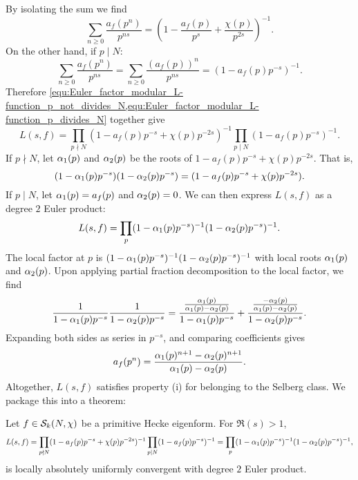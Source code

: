      By isolating the sum we find
      \begin{equation}\label{equ:Euler_factor_modular_L-function_p_not_divides_N}
        \sum_{n \ge 0}\frac{a_{f}(p^{n})}{p^{ns}} = \left(1-\frac{a_{f}(p)}{p^{s}}+\frac{\chi(p)}{p^{2s}}\right)^{-1}.
      \end{equation}
      On the other hand, if $p \mid N$:
      \begin{equation}\label{equ:Euler_factor_modular_L-function_p_divides_N}
        \sum_{n \ge 0}\frac{a_{f}(p^{n})}{p^{ns}} = \sum_{n \ge 0}\frac{(a_{f}(p))^{n}}{p^{ns}} = \left(1-a_{f}(p)p^{-s}\right)^{-1}.
      \end{equation}
      Therefore \cref{equ:Euler_factor_modular_L-function_p_not_divides_N,equ:Euler_factor_modular_L-function_p_divides_N} together give
      \[
        L(s,f) = \prod_{p \nmid N}(1-a_{f}(p)p^{-s}+\chi(p)p^{-2s})^{-1}\prod_{p \mid N}(1-a_{f}(p)p^{-s})^{-1}.
      \]
      If $p \nmid N$, let $\alpha_{1}(p)$ and $\alpha_{2}(p)$ be the roots of $1-a_{f}(p)p^{-s}+\chi(p)p^{-2s}$. That is,
      \begin{equation}\label{equ:local_parameter_definition_modfular_forms}
        (1-\alpha_{1}(p)p^{-s})(1-\alpha_{2}(p)p^{-s}) = (1-a_{f}(p)p^{-s}+\chi(p)p^{-2s}).
      \end{equation}
      If $p \mid N$, let $\alpha_{1}(p) = a_{f}(p)$ and $\alpha_{2}(p) = 0$. We can then express $L(s,f)$ as a degree $2$ Euler product:
      \[
        L(s,f) = \prod_{p}(1-\alpha_{1}(p)p^{-s})^{-1}(1-\alpha_{2}(p)p^{-s})^{-1}.
      \]
      The local factor at $p$ is $(1-\alpha_{1}(p)p^{-s})^{-1}(1-\alpha_{2}(p)p^{-s})^{-1}$ with local roots $\alpha_{1}(p)$ and $\alpha_{2}(p)$. Upon applying partial fraction decomposition to the local factor, we find
      \[
        \frac{1}{1-\alpha_{1}(p)p^{-s}}\frac{1}{1-\alpha_{2}(p)p^{-s}} = \frac{\frac{\alpha_{1}(p)}{\alpha_{1}(p)-\alpha_{2}(p)}}{1-\alpha_{1}(p)p^{-s}}+\frac{\frac{-\alpha_{2}(p)}{\alpha_{1}(p)-\alpha_{2}(p)}}{1-\alpha_{2}(p)p^{-s}}.
      \]
      Expanding both sides as series in $p^{-s}$, and comparing coefficients gives
      \begin{equation}\label{equ:Satake_coefficient_formula}
        a_{f}(p^{n}) = \frac{\alpha_{1}(p)^{n+1}-\alpha_{2}(p)^{n+1}}{\alpha_{1}(p)-\alpha_{2}(p)}.
      \end{equation}
      Altogether, $L(s,f)$ satisfies property (i) for belonging to the Selberg class. We package this into a theorem:
      \begin{theorem}
        Let $f \in \mathcal{S}_{k}(N,\chi)$ be a primitive Hecke eigenform. For $\Re(s) > 1$,
        \[
          L(s,f) = \prod_{p \nmid N}(1-a_{f}(p)p^{-s}+\chi(p)p^{-2s})^{-1}\prod_{p \mid N}(1-a_{f}(p)p^{-s})^{-1} = \prod_{p}(1-\alpha_{1}(p)p^{-s})^{-1}(1-\alpha_{2}(p)p^{-s})^{-1},
        \]
        is locally absolutely uniformly convergent with degree $2$ Euler product.
      \end{theorem}
